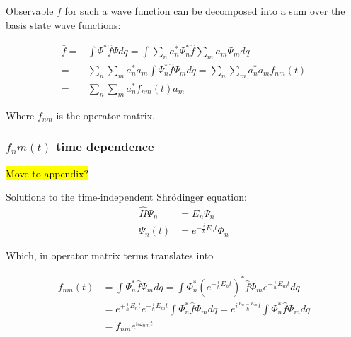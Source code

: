 			Observable $\bar{f}$  for such a wave function can be decomposed into a sum over the basis state wave functions:
			
			\begin{align}
				\bar{f} = & \int \Psi^* \hat{f} \Psi dq = \int \sum_{n}a_n^*\Psi_n^* \hat{f} \sum_{m}a_m\Psi_m dq \nonumber \\ 
				=  &\sum_{n}\sum_{m}a_n^* a_m \int \Psi_n^* \hat{f} \Psi_m dq = \sum_{n}\sum_{m}a_n^* a_m f_{nm}(t) \nonumber \\
				=  &\sum_{n}\sum_{m}a_n^* f_{nm}(t) a_m
			\end{align}
			
			Where $f_{nm}$ is the operator matrix.
			
			\subsubsection{$f_nm(t)$ time dependence}
				\hl{Move to appendix?}
				
				Solutions to the time-independent Shr\"odinger equation: 
				\begin{align}
					\hat{H}\Psi_n &= E_n \Psi_n \\
					\Psi_n(t) &= e^{-\frac{i}{\hbar}E_n t} \Phi_n
				\end{align}
				
				Which, in operator matrix terms translates into

				\begin{align}
					f_{nm}(t) &= \int \Psi_n^* \hat{f} \Psi_m dq = \int \Phi_n^* (e^{-\frac{i}{\hbar}E_n t})^* \hat{f} \Phi_m e^{-\frac{i}{\hbar}E_m t} dq \nonumber\\
					&=  e^{+\frac{i}{\hbar}E_n t}e^{-\frac{i}{\hbar}E_m t} \int \Phi_n^*\hat{f} \Phi_m  dq = e^{i \frac{E_n-E_m}{\hbar} t} \int \Phi_n^*\hat{f} \Phi_m  dq \nonumber\\
					&= f_{nm} e^{i \omega_{nm} t} 		
				\end{align}
				
